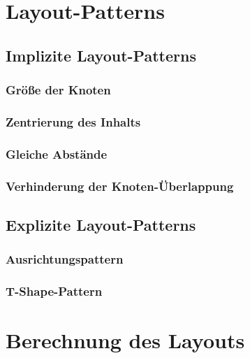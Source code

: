 
\section{Layout-Patterns}
\label{sec:layout-patterns}

\subsection{Implizite Layout-Patterns}
\label{subsec:implicit-layout-patterns}

\subsubsection{Größe der Knoten}
\subsubsection{Zentrierung des Inhalts}
\subsubsection{Gleiche Abstände}
\subsubsection{Verhinderung der Knoten-Überlappung}

\subsection{Explizite Layout-Patterns}
\label{subsec:explicit-layout-patterns}

\subsubsection{Ausrichtungspattern}
\subsubsection{T-Shape-Pattern}


\section{Berechnung des Layouts}
\label{sec:layout-calculation}


